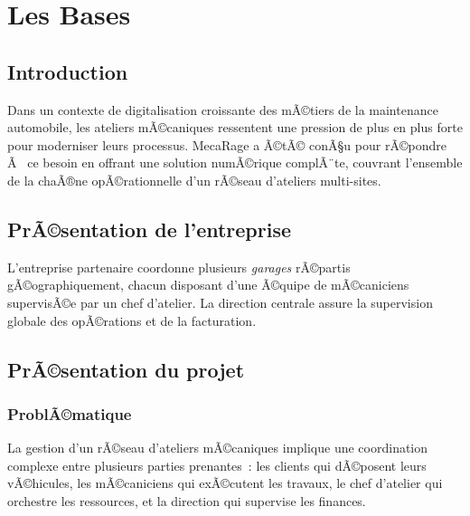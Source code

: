 ﻿%
\chapter{Les Bases}


\section{Introduction}

Dans un contexte de digitalisation croissante des mÃ©tiers de la maintenance
automobile, les ateliers mÃ©caniques ressentent une pression de plus en plus forte
pour moderniser leurs processus. MecaRage a Ã©tÃ© conÃ§u pour rÃ©pondre Ã  ce besoin
en offrant une solution numÃ©rique complÃ¨te, couvrant l'ensemble de la chaÃ®ne
opÃ©rationnelle d'un rÃ©seau d'ateliers multi-sites.

\section{PrÃ©sentation de l'entreprise}

L'entreprise partenaire coordonne plusieurs \textit{garages} rÃ©partis gÃ©ographiquement,
chacun disposant d'une Ã©quipe de mÃ©caniciens supervisÃ©e par un chef d'atelier.
La direction centrale assure la supervision globale des opÃ©rations et de la facturation.

\section{PrÃ©sentation du projet}

\subsection{ProblÃ©matique}

La gestion d'un rÃ©seau d'ateliers mÃ©caniques implique une coordination complexe
entre plusieurs parties prenantes~: les clients qui dÃ©posent leurs vÃ©hicules,
les mÃ©caniciens qui exÃ©cutent les travaux, le chef d'atelier qui orchestre les
ressources, et la direction qui supervise les finances.

